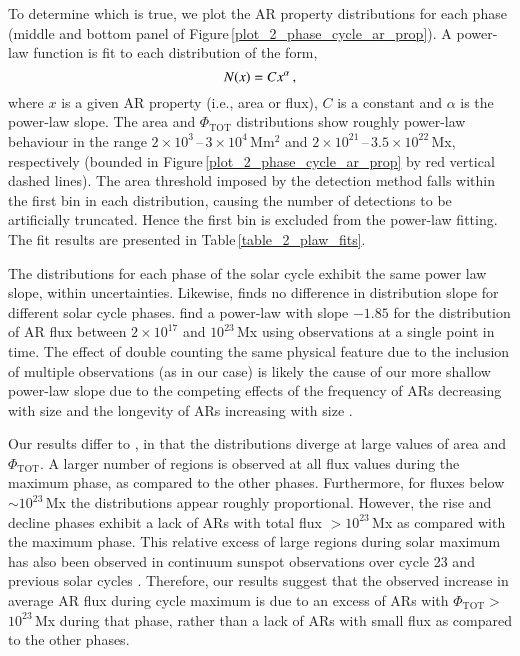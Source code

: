 \documentclass[namedreferences]{solarphysics}
\begin{document}
\begin{article}
To determine which is true, we plot the AR property distributions for each phase (middle and bottom panel of Figure\,\ref{plot_2_phase_cycle_ar_prop}). A power-law function is fit to each distribution %
 of the form,
\begin{equation}\label{eqn:powerlaw}
N(x) = C x^\alpha \mbox{\,,}
\end{equation}
where $x$ is a given AR property (i.e., area or flux), $C$ is a constant and $\alpha$ is the power-law slope. The area and $\Phi_{\mathrm{TOT}}$ distributions show roughly power-law behaviour in the range $2\times10^{3}$\,--\,$3\times10^4$\,Mm$^{2}$ and $2\times10^{21}$\,--\,$3.5\times10^{22}$\,Mx, respectively (bounded in Figure\,\ref{plot_2_phase_cycle_ar_prop} by red vertical dashed lines). The area threshold imposed by the detection method falls within the first bin in each distribution, causing the number of detections to be artificially truncated. Hence the first bin is excluded from the power-law fitting. The fit results are presented in Table\,\ref{table_2_plaw_fits}.

The distributions for each phase of the solar cycle exhibit the same power law slope, within uncertainties. Likewise, \citet{harvey:1993} finds no difference in distribution slope for different solar cycle phases. \citet{Parnell:2009} find a power-law with slope $-1.85$ for the distribution of AR flux between $2\times10^{17}$ and $10^{23}$\,Mx using observations at a single point in time. The effect of double counting the same physical feature due to the inclusion of multiple observations (as in our case) is likely the cause of our more shallow power-law slope \citep{tang:1984} due to the competing effects of the frequency of ARs decreasing with size and the longevity of ARs increasing with size \citep{Lefevre:2011}.

Our results differ to \citet{harvey:1993}, in that the distributions diverge at large values of area and $\Phi_{\mathrm{TOT}}$. 
A larger number of regions is observed at all flux values during the maximum phase, as compared to the other phases. Furthermore, for fluxes below $\sim$$10^{23}$\,Mx the distributions appear roughly proportional. However, the rise and decline phases exhibit a lack of ARs with total flux $>$$10^{23}$\,Mx as compared with the maximum phase.%
This relative excess of large regions during solar maximum has also been observed in continuum sunspot observations over cycle 23 and previous solar cycles \citep{Hathaway:2010b,Lefevre:2011,Kilcik:2011,deToma:2013}. Therefore, our results suggest that the observed increase in average AR flux during cycle maximum is due to an excess of ARs with $\Phi_{\mathrm{TOT}} $$>$$10^{23}$\,Mx during that phase, rather than a lack of ARs with small flux as compared to the other phases.


\end{article}
\end{document}
